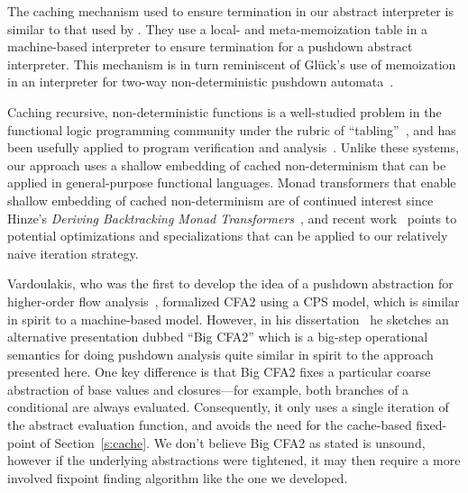 The caching mechanism used to ensure termination in our abstract interpreter is
similar to that used by \citet{dvanhorn:Johnson2014Abstracting}. They use a local- and
meta-memoization table in a machine-based interpreter to ensure termination for
a pushdown abstract interpreter.  This mechanism is in turn reminiscent of
Gl\"{u}ck's use of memoization in an interpreter for two-way non-deterministic
pushdown automata~\cite{local:gluck-schmidtfest13}.

Caching recursive, non-deterministic functions is a well-studied
problem in the functional logic programming community under the rubric
of ``tabling''~\cite{local:tamaki1986old, local:bol1993tabulated,
  local:chen1996tabled, local:swift2012xsb}, and has been usefully
applied to program verification and
analysis~\cite{local:dawson1996practical,
  local:janssens1998use}. Unlike these systems, our approach uses a
shallow embedding of cached non-determinism that can be applied in
general-purpose functional languages.
%
Monad transformers that enable shallow embedding of cached non-determinism are
of continued interest since Hinze's \emph{Deriving Backtracking Monad
  Transformers}~\cite{local:hinze2000deriving, local:kiselyov2005backtracking,
  local:fischer2011purely}, and recent work~\cite{local:ploeg2014reflection,
  local:vandenbroucke2016fixing} points to potential optimizations and
specializations that can be applied to our relatively naive iteration strategy.

Vardoulakis, who was the first to develop the idea of a pushdown abstraction
for higher-order flow analysis~\cite{dvanhorn:Vardoulakis2011CFA2}, formalized
CFA2 using a CPS model, which is similar in spirit to a machine-based model.
However, in his dissertation~\cite{local:vardoulakis-diss12} he sketches an
alternative presentation dubbed ``Big CFA2'' which is a big-step operational
semantics for doing pushdown analysis quite similar in spirit to the approach
presented here.  One key difference is that Big CFA2 fixes a particular coarse
abstraction of base values and closures---for example, both branches of a
conditional are always evaluated.  Consequently, it only uses a single
iteration of the abstract evaluation function, and avoids the need for the
cache-based fixed-point of Section~\ref{s:cache}.  We don't believe Big CFA2 as
stated is unsound, however if the underlying abstractions were tightened, it
may then require a more involved fixpoint finding algorithm like the one we
developed.

